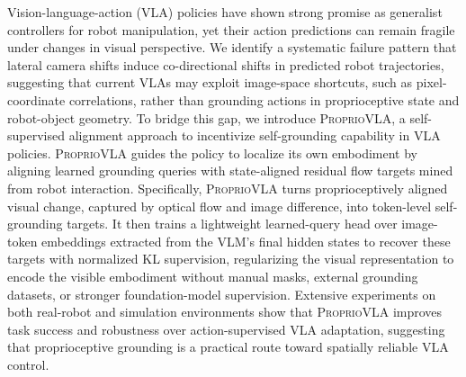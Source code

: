 Vision-language-action (VLA) policies have shown strong promise as generalist
controllers for robot manipulation, yet their action predictions can remain
fragile under changes in visual perspective. We identify a systematic failure pattern that lateral camera shifts induce co-directional shifts in predicted robot
trajectories, suggesting that current VLAs may exploit image-space shortcuts,
such as pixel-coordinate correlations, rather than grounding actions in
proprioceptive state and robot-object geometry.
To bridge this gap, we introduce \textsc{ProprioVLA}, a self-supervised
alignment approach to incentivize self-grounding capability in VLA policies.
\textsc{ProprioVLA} guides the policy to localize its own
embodiment by aligning learned grounding queries with state-aligned residual
flow targets mined from robot interaction.
Specifically, \textsc{ProprioVLA} turns proprioceptively aligned visual change,
captured by optical flow and image difference, into token-level self-grounding
targets. It then trains a lightweight learned-query head over image-token
embeddings extracted from the VLM's final hidden states to recover these
targets with normalized KL supervision,
regularizing the visual representation to encode the visible embodiment
without manual masks, external grounding datasets, or stronger foundation-model
supervision.
Extensive experiments on both real-robot and simulation
environments show that \textsc{ProprioVLA} improves task success and robustness
over action-supervised VLA adaptation, suggesting that proprioceptive grounding
is a practical route toward spatially reliable VLA control. 
